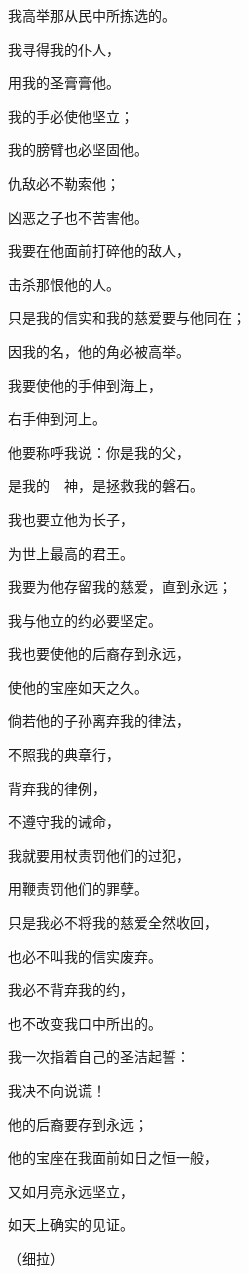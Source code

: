 {\par }{\Q 我高举那从民中所拣选的。
\par }{\Q {}我寻得我的仆人{}，
\par }{\Q 用我的圣膏膏他。
\par }{\Q {}我的手必使他坚立；
\par }{\Q 我的膀臂也必坚固他。
\par }{\Q {}仇敌必不勒索他；
\par }{\Q 凶恶之子也不苦害他。
\par }{\Q {}我要在他面前打碎他的敌人，
\par }{\Q 击杀那恨他的人。
\par }{\Q {}只是我的信实和我的慈爱要与他同在；
\par }{\Q 因我的名，他的角必被高举。
\par }{\Q {}我要使他的{}手伸到海上，
\par }{\Q 右手伸到河上。
\par }{\Q {}他要称呼我说：你是我的父，
\par }{\Q 是我的　神，是拯救我的磐石。
\par }{\Q {}我也要立他为长子，
\par }{\Q 为世上最高的君王。
\par }{\Q {}我要为他存留我的慈爱，直到永远；
\par }{\Q 我与他立的约必要坚定。
\par }{\Q {}我也要使他的后裔存到永远，
\par }{\Q 使他的宝座如天之久。
\par }{\BB \par }{\Q {}倘若他的子孙离弃我的律法，
\par }{\Q 不照我的典章行，
\par }{\Q {}背弃我的律例，
\par }{\Q 不遵守我的诫命，
\par }{\Q {}我就要用杖责罚他们的过犯，
\par }{\Q 用鞭责罚他们的罪孽。
\par }{\Q {}只是我必不将我的慈爱全然收回，
\par }{\Q 也必不叫我的信实废弃。
\par }{\Q {}我必不背弃我的约，
\par }{\Q 也不改变我口中所出的。
\par }{\Q {}我一次指着自己的圣洁起誓：
\par }{\Q 我决不向{}说谎！
\par }{\Q {}他的后裔要存到永远；
\par }{\Q 他的宝座在我面前如日之恒一般，
\par }{\Q {}又如月亮永远坚立，
\par }{\Q 如天上确实的见证。
\par }{\QS （细拉）
\par }
